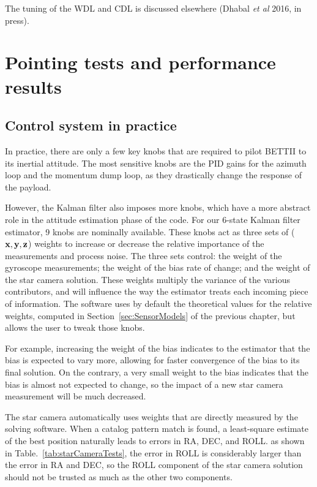 The tuning of the WDL and CDL is discussed elsewhere (Dhabal \textit{et al} 2016, in press).



\section{Pointing tests and performance results}

\subsection{Control system in practice}

In practice, there are only a few key knobs that are required to pilot BETTII to its inertial attitude. The most sensitive knobs are the PID gains for the azimuth loop and the momentum dump loop, as they drastically change the response of the payload. 

However, the Kalman filter also imposes more knobs, which have a more abstract role in the attitude estimation phase of the code. For our 6-state Kalman filter estimator, 9 knobs are nominally available. These knobs act as three sets of ($\textrm{\textbf{x}}, \textrm{\textbf{y}}, \textrm{\textbf{z}}$) weights to increase or decrease the relative importance of the measurements and process noise. The three sets control: the weight of the gyroscope measurements; the weight of the bias rate of change; and the weight of the star camera solution. These weights multiply the variance of the various contributors, and will influence the way the estimator treats each incoming piece of information. The software uses by default the theoretical values for the relative weights, computed in Section~\ref{sec:SensorModels} of the previous chapter, but allows the user to tweak those knobs. 

For example, increasing the weight of the bias indicates to the estimator that the bias is expected to vary more, allowing for faster convergence of the bias to its final solution. On the contrary, a very small weight to the bias indicates that the bias is almost not expected to change, so the impact of a new star camera measurement will be much decreased. 

The star camera automatically uses weights that are directly measured by the solving software. When a catalog pattern match is found, a least-square estimate of the best position naturally leads to errors in RA, DEC, and ROLL. as shown in Table.~\ref{tab:starCameraTests}, the error in ROLL is considerably larger than the error in RA and DEC, so the ROLL component of the star camera solution should not be trusted as much as the other two components. 


